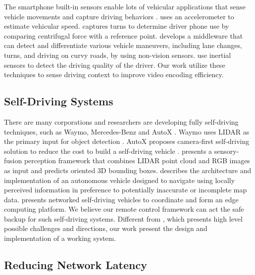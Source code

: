 The smartphone built-in sensors enable lots of vehicular applications
that sense vehicle movements and capture driving behaviors 
\cite{hansenspeed, wang2013sensing, chen2015invisible, uber, cmtelematics}. 
\cite{hansenspeed} uses an accelerometer to estimate vehicular speed. 
\cite{wang2013sensing} captures turns to determine driver phone
use by comparing centrifugal force with a reference point. 
\cite{chen2015invisible} develops a middleware that can detect 
and differentiate various vehicle maneuvers, 
including lane changes, turns, and driving on curvy roads,
by using non-vision sensors.
\cite{singh2013using, fazeen2012safe} use inertial sensors to detect the driving quality of the
driver.
Our work utilize these techniques to sense driving context 
to improve video encoding efficiency.  

 
\subsection{Self-Driving Systems}

There are many corporations and researchers are developing fully self-driving
techniques, such as Waymo, Mercedes-Benz and AutoX \cite{waymo, benz, autox}.
Waymo uses LIDAR as the primary input for object detection \cite{waymo}. 
AutoX proposes camera-first self-driving solution to reduce
the cost to build a self-driving vehicle \cite{autox}.  
\cite{cvpr17chen} presents a sensory-fusion perception framework 
that combines LIDAR point cloud and RGB images as input and 
predicts oriented 3D bounding boxes. 
\cite{leonard2008perception} describes the architecture and implementation 
of an autonomous vehicle designed to navigate using locally perceived 
information in preference to potentially inaccurate or incomplete map data. 
\cite{lee2016internet} presents networked self-driving vehicles to coordinate 
and form an edge computing platform. 
We believe our remote control framework can act the safe backup
for such self-driving systems.
Different from \cite{kang2018rc}, which presents high level possible 
challenges and directions, 
our work present the design and implementation of a working system.  


\subsection{Reducing Network Latency}

